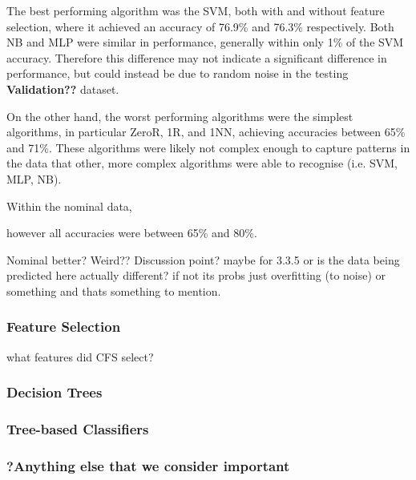 The best performing algorithm was the SVM, both with and without feature selection, where it achieved an accuracy of 76.9\% and 76.3\% respectively. Both NB and MLP were similar in performance, generally within only 1\% of the SVM accuracy. Therefore this difference may not indicate a significant difference in performance, but could instead be due to random noise in the testing \textbf{Validation??} dataset.

On the other hand, the worst performing algorithms were the simplest algorithms, in particular ZeroR, 1R, and 1NN, achieving accuracies between 65\% and 71\%. These algorithms were likely not complex enough to capture patterns in the data that other, more complex algorithms were able to recognise (i.e. SVM, MLP, NB).


Within the nominal data, 


however all accuracies were between 65\% and 80\%. 

Nominal better? Weird?? Discussion point? maybe for 3.3.5
or is the data being predicted here actually different? if not its probs just overfitting (to noise) or something and thats something to mention.

\subsubsection{Feature Selection}


what features did CFS select?

\subsubsection{Decision Trees}



\subsubsection{Tree-based Classifiers}




\subsubsection{?Anything else that we consider important}

